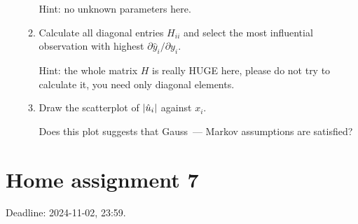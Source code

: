 \documentclass[12pt]{article}
\DeclarePairedDelimiter{\abs}{\lvert}{\rvert}
\begin{document}
\begin{enumerate}
\begin{enumerate}[resume]
    Hint: no unknown parameters here. 

    \item Calculate all diagonal entries $H_{ii}$ and select the most influential observation with highest $\partial \hat y_i /\partial y_i$.
    
    Hint: the whole matrix $H$ is really HUGE here, please do not try to calculate it, you need only diagonal elements. 

    \item Draw the scatterplot of $\abs{\hat u_i}$ against $x_i$. 
    
    Does this plot suggests that Gauss~— Markov assumptions are satisfied?
   \end{enumerate}

\end{enumerate}

\section*{Home assignment 7}

Deadline: 2024-11-02, 23:59.
\end{document}
